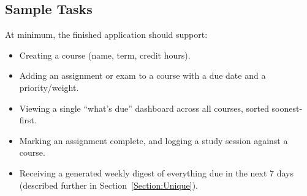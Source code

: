 \subsection{Sample Tasks}
At minimum, the finished application should support:
\begin{itemize}
\item Creating a course (name, term, credit hours).
\item Adding an assignment or exam to a course with a due date and a priority/weight.
\item Viewing a single ``what's due'' dashboard across all courses, sorted soonest-first.
\item Marking an assignment complete, and logging a study session against a course.
\item Receiving a generated weekly digest of everything due in the next 7 days (described further in Section~\ref{Section:Unique}).
\end{itemize}

